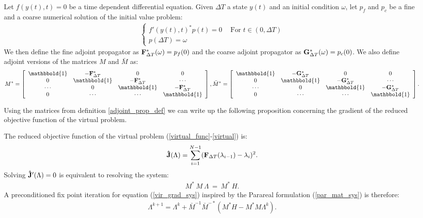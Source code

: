 \begin{definition} \label{adjoint_prop_def}
Let $f(y(t),t)=0$ be a time dependent differential equation. Given $\Delta T$ a state $y(t)$ and an initial condition $\omega$, let $p_f$ and $p_c$ be a fine and a coarse numerical solution of the initial value problem:
\begin{align}
 \left\{
     \begin{array}{lr}
		f'(y(t),t)^*p(t)=0 \ \quad \textrm{For $t \in (0,\Delta T)$} \\
		p(\Delta T)=\omega
	\end{array}
	\right.	
\end{align}
We then define the fine adjoint propagator as $\bold F_{\Delta T}^*(\omega) = p_f(0)$ and the coarse adjoint propagator as $\bold G_{\Delta T}^*(\omega) = p_c(0)$. We also define adjoint versions of the matrices $M$ and $\bar M$ as: 
\begin{align*}
M^*= \left[ \begin{array}{cccc}
   \mathbbold{1} & -\bold{F}_{\Delta T}^* & 0 & 0 \\  
   0 & \mathbbold{1} & -\bold{F}_{\Delta T}^* & \cdots \\ 
   \cdots &0 &  \mathbbold{1} & -\bold{F}_{\Delta T}^* \\
   0 &\cdots &\cdots &  \mathbbold{1}  \\
   \end{array}  \right],
\bar M^*= \left[ \begin{array}{cccc}
   \mathbbold{1} & -\bold{G}_{\Delta T}^* & 0 & 0 \\  
   0 & \mathbbold{1} & -\bold{G}_{\Delta T}^* & \cdots \\ 
   \cdots &0 &  \mathbbold{1} & -\bold{G}_{\Delta T}^* \\
   0 &\cdots &\cdots &  \mathbbold{1}  \\
   \end{array}  \right].
\end{align*}
\end{definition} 
\noindent
Using the matrices from definition \ref{adjoint_prop_def} we can write up the following proposition concerning the gradient of the reduced objective function of the virtual problem.
\begin{proposition} \label{vir_grad_prop}
The reduced objective function of the virtual problem (\ref{virtual_func}-\ref{virtual}) is:
\begin{align}
\bold{\hat J}(\Lambda) = \sum_{i=1}^{N-1} (\bold F_{\Delta T}(\lambda_{i-1})-\lambda_{i})^2.\label{reduced_viritual}
\end{align}
Solving $\bold{\hat J}'(\Lambda)=0$ is equivalent to resolving the system:
\begin{align}
M^* \ M \ \Lambda \ = \ M^* \ H. \label{vir_grad_sys}
\end{align}
A preconditioned fix point iteration for equation (\ref{vir_grad_sys}) inspired by the Parareal formulation (\ref{par_mat_sys}) is therefore:
\begin{align}
\Lambda^{k+1} = \Lambda^k + \bar{M}^{-1}\bar M^{-*}(M^*H-M^*M\Lambda^k). \label{grad_fix_iter}
\end{align}
\end{proposition}
